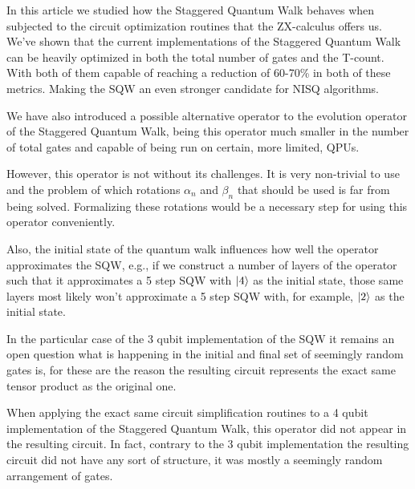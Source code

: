 In this article we studied how the Staggered Quantum Walk behaves when subjected to the circuit optimization routines that the ZX-calculus offers us. We've shown that the current implementations of the Staggered Quantum Walk can be heavily optimized in both the total number of gates and the T-count. With both of them capable of reaching a reduction of 60-70\% in both of these metrics. Making the SQW an even stronger candidate for NISQ algorithms.

We have also introduced a possible alternative operator to the evolution operator of the Staggered Quantum Walk, being this operator much smaller in the number of total gates and capable of being run on certain, more limited, QPUs.

However, this operator is not without its challenges. It is very non-trivial to use and the problem of which rotations $\alpha_n$ and $\beta_n$ that should be used is far from being solved. Formalizing these rotations would be a necessary step for using this operator conveniently.

Also, the initial state of the quantum walk influences how well the operator approximates the SQW, e.g., if we construct a number of layers of the operator such that it approximates a 5 step SQW with $\ket{4}$ as the initial state, those same layers most likely won't approximate a 5 step SQW with, for example, $\ket{2}$ as the initial state.

In the particular case of the 3 qubit implementation of the SQW it remains an open question what is happening in the initial and final set of seemingly random gates is, for these are the reason the resulting circuit represents the exact same tensor product as the original one.

When applying the exact same circuit simplification routines to a 4 qubit implementation of the Staggered Quantum Walk, this operator did not appear in the resulting circuit. In fact, contrary to the 3 qubit implementation the resulting circuit did not have any sort of structure, it was mostly a seemingly random arrangement of gates.







